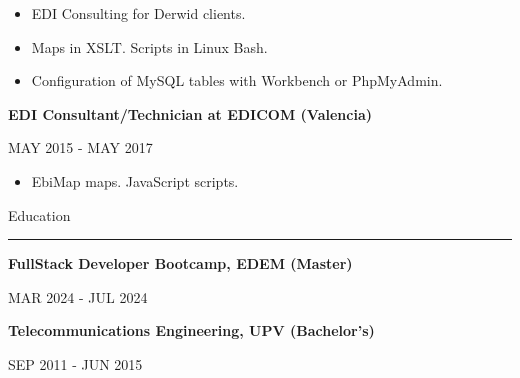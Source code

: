\documentclass{letter}
\begin{document}
\begin{minipage}[t]{0.60\textwidth}
\begin{itemize}
    \item EDI Consulting for Derwid clients.
    \item Maps in XSLT. Scripts in Linux Bash.
    \item Configuration of MySQL tables with Workbench or PhpMyAdmin.
\end{itemize}

{\large \textbf{EDI Consultant/Technician at EDICOM (Valencia)}}

{\small MAY 2015 - MAY 2017}
\begin{itemize}
    \item EbiMap maps. JavaScript scripts.
\end{itemize}

{\large Education}
\rule{\linewidth}{0.4pt}

{\large \textbf{FullStack Developer Bootcamp, EDEM (Master)}}

{\small MAR 2024 - JUL 2024}

{\large \textbf{Telecommunications Engineering, UPV (Bachelor's)}}

{\small SEP 2011 - JUN 2015}

\end{minipage}
\end{document}
